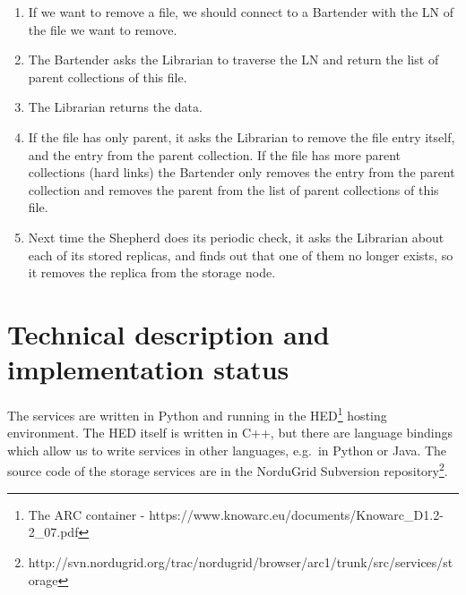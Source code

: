 \documentclass{book}
\begin{document}
\begin{figure}[ht]
\end{figure}
\begin{enumerate}
    \item If we want to remove a file, we should connect to a Bartender with the LN of the file we want to remove.
    \item The Bartender asks the Librarian to traverse the LN and return the list of parent collections of this file.
    \item The Librarian returns the data.
    \item If the file has only parent, it asks the Librarian to remove the file entry itself, and the entry from the parent collection. If the file has more parent collections (hard links) the Bartender only removes the entry from the parent collection and removes the parent from the list of parent  collections of this file.
    \item Next time the Shepherd does its periodic check, it asks the Librarian about each of its stored replicas, and finds out that one of them no longer exists, so it removes the replica from the storage node.
\end{enumerate}




\chapter{Technical description and implementation status} %
\label{cha:technical_description_and_implementation_status}

The services are written in Python and running in the HED\footnote{The ARC container - https://www.knowarc.eu/documents/Knowarc\_D1.2-2\_07.pdf} hosting environment. The HED itself is written in C++, but there are language bindings which allow us to write services in other languages, e.g.~in Python or Java. The source code of the storage services are in the NorduGrid Subversion repository\footnote{http://svn.nordugrid.org/trac/nordugrid/browser/arc1/trunk/src/services/storage}.
\end{document}
